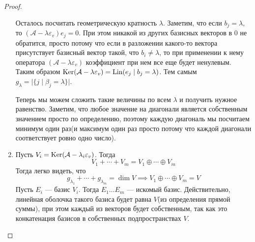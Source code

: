 \documentclass[../main.tex]{subfiles}
\begin{document}
\begin{proof}
\begin{enumerate}
  Осталось посчитать геометрическую кратность $\lambda$. Заметим, что если $b_j = \lambda$, то $(\mathcal{A} - \lambda \varepsilon_v) e_j = 0$. При этом никакой из других базисных векторов в 0 не обратится, просто потому что если в разложении какого-то вектора присутствует базисный вектор такой, что $b_i \neq \lambda$, то при применении к нему оператора $(\mathcal{A} - \lambda \varepsilon_v)$ коэффициент при нем все еще будет ненулевым. Таким образом $\operatorname{Ker}(\mathcal{A} - \lambda \varepsilon_v) = \operatorname{Lin}(e_j \; | \; b_j = \lambda)$. Тем самым $g_{\lambda} = |\{j \; | \; \beta_j = \lambda\}|$.

  Теперь мы можем сложить такие величины по всем $\lambda$ и получить нужное равенство. Заметим, что любое значение на диагонали является собственным значением просто по определению, поэтому каждую диагональ мы посчитаем минимум один раз(и максимум один раз просто потому что каждой диагонали соответствует ровно одно число).
  \item[] 
  Пусть $V_i = \operatorname{Ker}(\mathcal{A} - \lambda_i \varepsilon_v)$. Тогда
  \begin{equation*}
    V_1 + \dotsb + V_m = V_1 \oplus \dotsb \oplus V_m
  \end{equation*}
  Тогда легко видеть, что
  \begin{equation*}
    g_{\lambda_1} + \dotsb + g_{\lambda_m} = \dim V
    \implies
    V_1 \oplus \dotsb \oplus V_m = V
  \end{equation*}
  Пусть $E_i$ --- базис $V_i$. Тогда $E_1\dotso E_m$ --- искомый базис. Действительно, линейная оболочка такого базиса будет равна $V$(из определения прямой суммы), при этом каждый из векторов будет собственным, так как это конкатенация базисов в собственных подпространствах $V$.
  \end{enumerate}
\end{proof}
\end{document}
